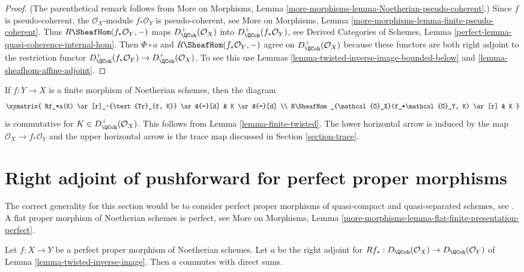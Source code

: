 \begin{proof}
(The parenthetical remark follows from More on Morphisms, Lemma
\ref{more-morphisms-lemma-Noetherian-pseudo-coherent}.)
Since $f$ is pseudo-coherent, the $\mathcal{O}_X$-module $f_*\mathcal{O}_Y$
is pseudo-coherent, see More on Morphisms, Lemma
\ref{more-morphisms-lemma-finite-pseudo-coherent}.
Thus $R\SheafHom(f_*\mathcal{O}_Y, -)$ maps
$D_\QCoh^+(\mathcal{O}_X)$ into
$D_\QCoh^+(f_*\mathcal{O}_Y)$, see
Derived Categories of Schemes, Lemma
\ref{perfect-lemma-quasi-coherence-internal-hom}.
Then $\Phi \circ a$ and $R\SheafHom(f_*\mathcal{O}_Y, -)$
agree on $D_\QCoh^+(\mathcal{O}_X)$ because these functors are
both right adjoint to the restriction functor
$D_\QCoh^+(f_*\mathcal{O}_Y) \to D_\QCoh^+(\mathcal{O}_X)$. To see this
use Lemmas \ref{lemma-twisted-inverse-image-bounded-below} and
\ref{lemma-sheafhom-affine-adjoint}.
\end{proof}

\begin{remark}
\label{remark-trace-map-finite}
If $f : Y \to X$ is a finite morphism of Noetherian schemes, then the diagram
$$
\xymatrix{
Rf_*a(K) \ar[r]_-{\text{Tr}_{f, K}} \ar@{=}[d] & K \ar@{=}[d] \\
R\SheafHom_{\mathcal{O}_X}(f_*\mathcal{O}_Y, K) \ar[r] & K
}
$$
is commutative for $K \in D_\QCoh^+(\mathcal{O}_X)$. This follows
from Lemma \ref{lemma-finite-twisted}. The lower horizontal
arrow is induced by the map $\mathcal{O}_X \to f_*\mathcal{O}_Y$ and the
upper horizontal arrow is the trace map discussed in
Section \ref{section-trace}.
\end{remark}







\section{Right adjoint of pushforward for perfect proper morphisms}
\label{section-flat-and-proper}

\noindent
The correct generality for this section would be to consider
perfect proper morphisms of quasi-compact and quasi-separated
schemes, see \cite{LN}. A flat proper morphism of Noetherian
schemes is perfect, see
More on Morphisms, Lemma
\ref{more-morphisms-lemma-flat-finite-presentation-perfect}.

\begin{lemma}
\label{lemma-proper-flat-noetherian}
Let $f : X \to Y$ be a perfect proper morphism of Noetherian schemes.
Let $a$ be the right adjoint for
$Rf_* : D_\QCoh(\mathcal{O}_X) \to D_\QCoh(\mathcal{O}_Y)$ of
Lemma \ref{lemma-twisted-inverse-image}. Then $a$ commutes with direct sums.
\end{lemma}


